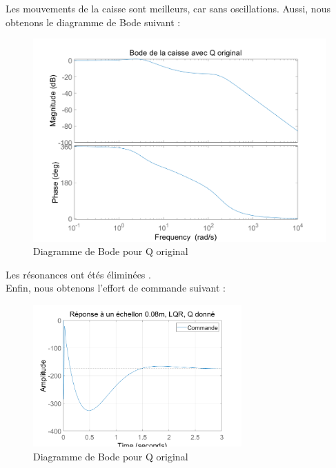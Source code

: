 \documentclass[a4paper,12pt]{insa} %
\begin{document}
Les mouvements de la caisse sont meilleurs, car sans oscillations. 
Aussi, nous obtenons le diagramme de Bode suivant : 
\begin{center}
    \begin{figure}[H]
        \centering
        \includegraphics[width=13cm, keepaspectratio]{figures/bode_Q.png}
        \caption{Diagramme de Bode pour Q original}
    \end{figure}
\end{center}
Les résonances ont étés éliminées .\\
Enfin, nous obtenons l'effort de commande suivant : 
\begin{center}
    \begin{figure}[H]
        \centering
        \includegraphics[width=8cm, keepaspectratio]{figures/effort_cmd.png}
        \caption{Diagramme de Bode pour Q original}
    \end{figure}
\end{center}
\end{document}
